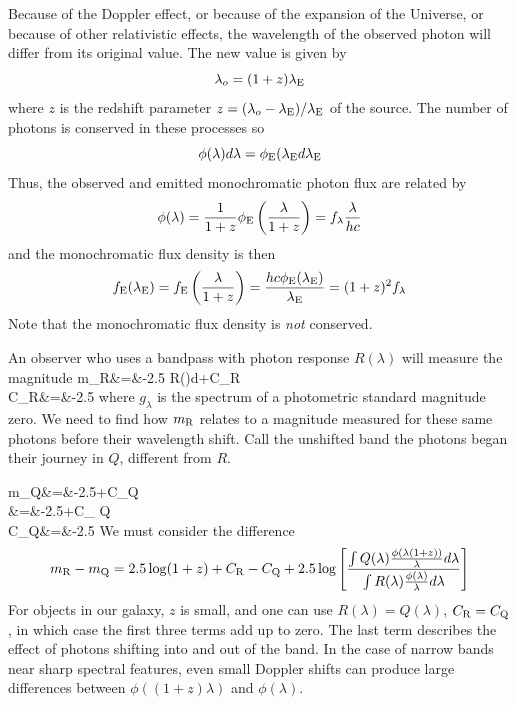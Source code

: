 Because of the Doppler effect, or because of the expansion of the
Universe, or because of other relativistic effects, the wavelength of
the observed photon will differ from its original value. The new value
is given by
\[
\lambda_o=(1+z)\lambda_{\rm E}
\]
where $z$ is the redshift parameter $z={(\lambda_o-\lambda_{\rm
  E})/\lambda_{\rm E}}$ of the source. The number of photons is
conserved in these processes so 
\[
\phi(\lambda)d\lambda=\phi_{\rm E}(\lambda_{\rm E}d\lambda_{\rm E}
\]
Thus, the observed and emitted monochromatic photon flux are related by 
\[
\phi(\lambda)=\frac{1}{1+z}\phi_{\rm E}\left(\frac{\lambda}{1+z}\right)=f_\lambda\frac{\lambda}{hc}
\]
and the monochromatic flux density is then
\[
f_{\rm E}(\lambda_{\rm E})=f_{\rm
  E}\left(\frac{\lambda}{1+z}\right)=\frac{hc\phi_{\rm E}(\lambda_{\rm
    E})}{\lambda_{\rm E}}=(1+z)^2f_\lambda
\]
Note that the monochromatic flux density is {\it not} conserved.

An observer who uses a bandpass with photon response $R(\lambda)$ will
measure the magnitude
\bua
m_{\rm R}&=&-2.5\log
{ \int R(\lambda)\frac{\phi(\lambda)}{\lambda}d\lambda}+C_{\rm R} \\
C_{\rm R}&=&-2.5
\eua
where $g_\lambda$ is the spectrum of a photometric standard magnitude
zero. We need to find how $m_{\rm R}$ relates to a magnitude measured
for these same photons before their wavelength shift. Call the
unshifted band the photons began their journey in $Q$, different from $R$.

\bua
m_{\rm Q}&=&-2.5+C_{\rm Q} \\
                &=&-2.5\log{}+C_{\rm
                  Q} \\
C_{\rm Q}&=&-2.5
\eua
We must consider the difference
\[
m_{\rm R}-m_{\rm Q}=2.5\log(1+z)
+C_{\rm R}-C_{\rm Q}+2.5\log\left[
  \frac{\int  Q(\lambda)\frac{\phi(\lambda(1+z))}{\lambda}d\lambda}{\int R(\lambda)\frac{\phi(\lambda)}{\lambda}d\lambda}\right]
\]
For objects in our galaxy, $z$ is small, and one can use
$R(\lambda)=Q(\lambda)$, $C_{\rm R}=C_{\rm Q}$, in which case the
first three terms add up to zero. The last term describes the effect
of photons shifting into and out of the band. In the case of narrow
bands near sharp spectral features, even small Doppler shifts can
produce large differences between $\phi((1+z)\lambda)$ and
$\phi(\lambda)$. 


